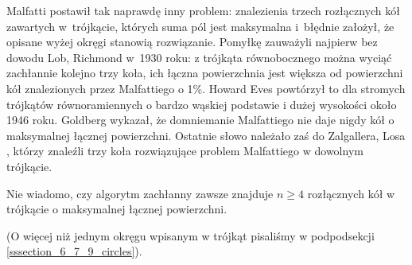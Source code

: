 Malfatti postawił tak naprawdę inny problem: znalezienia trzech rozłącznych kół zawartych w~trójkącie, których suma pól jest maksymalna i~błędnie założył, że opisane wyżej okręgi stanowią rozwiązanie.
Pomyłkę zauważyli najpierw bez dowodu Lob, Richmond \cite{lob_richmond_1930} w~1930 roku: z trójkąta równobocznego można wyciąć zachłannie kolejno trzy koła, ich łączna powierzchnia jest większa od powierzchni kół znalezionych przez Malfattiego o 1\%.
%
%
Howard Eves powtórzył to dla stromych trójkątów równoramiennych o bardzo wąskiej podstawie i dużej wysokości około 1946 roku.
%
Goldberg \cite{goldberg_1967} wykazał, że domniemanie Malfattiego nie daje nigdy kół o maksymalnej łącznej powierzchni.
Ostatnie słowo należało zaś do Zalgallera, Losa \cite{zalgaller_los_1992}, którzy znaleźli trzy koła rozwiązujące problem Malfattiego w dowolnym trójkącie.
%
%

Nie wiadomo, czy algorytm zachłanny zawsze znajduje $n \ge 4$ rozłącznych kół w trójkącie o maksymalnej łącznej powierzchni.

(O więcej niż jednym okręgu wpisanym w trójkąt pisaliśmy w podpodsekcji \ref{sssection_6_7_9_circles}).
